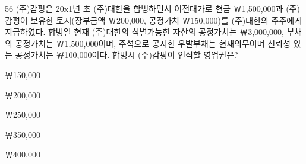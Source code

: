 \begin{question}{56}
(주)감평은 20x1년 초 (주)대한을 합병하면서 이전대가로 현금 ￦1,500,000과 (주)감평이 보유한 토지(장부금액 ￦200,000, 공정가치 ￦150,000)를 (주)대한의 주주에게 지급하였다. 합병일 현재 (주)대한의 식별가능한 자산의 공정가치는 ￦3,000,000, 부채의 공정가치는 ￦1,500,000이며, 주석으로 공시한 우발부채는 현재의무이며 신뢰성 있는 공정가치는 ￦100,000이다. 합병시 (주)감평이 인식할 영업권은? \par
\begin{choices}
  \item ￦150,000
  \item ￦200,000
  \item ￦250,000
  \item ￦350,000
  \item ￦400,000
\end{choices}
\end{question}
